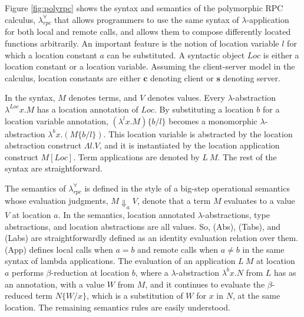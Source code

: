 \documentclass[a4paper]{article}
\theoremstyle{plain}
\theoremstyle{definition}
\newcommand{\polyrpc}{$\lambda_{rpc}^{\forall}$\xspace}
\newcommand{\client}{\textbf{c}}
\newcommand{\server}{\textbf{s}}
\newcommand{\evalRPC}[3]{#1\Downarrow_{#2}#3}
\newcommand{\lamL}[3]{\lambda^{#1}#2.#3}
\newcommand{\subst}[2]{\{#1/#2\}}
\newcommand{\Loc}{Loc}
\begin{document}
Figure \ref{fig:polyrpc} shows the syntax and semantics of the
polymorphic RPC calculus, {\polyrpc} that allows programmers to use
the same syntax of $\lambda$-application for both local and remote
calls, and allows them to compose differently located functions
arbitrarily.
%
An important feature is the notion of location variable $l$ for which
a location constant $a$ can be substituted.
%
A syntactic object $\Loc$ is either a location constant or a location
variable.
%
Assuming the client-server model in the calculus, location constants
are either $\client$ denoting client or $\server$ denoting server.

In the syntax, $M$ denotes terms, and $V$ denotes values.
%
Every $\lambda$-abstraction $\lamL{\Loc}{x}{M}$ has a location
annotation of $\Loc$.
%
By substituting a location $b$ for a location variable annotation,
$(\lamL{l}{x}{M})\subst{b}{l}$ becomes a monomorphic
$\lambda$-abstraction $\lamL{b}{x}{(M\subst{b}{l})}$.
%
This location variable is abstracted by the location abstraction
construct $\Lambda l.V$, and it is instantiated by the location
application construct $M[\Loc]$.
%
Term applications are denoted by $L \ M$.  The rest of the syntax are
straightforward.

The semantics of {\polyrpc} is defined in the style of a big-step
operational semantics whose evaluation judgments, $\evalRPC{M}{a}{V}$,
denote that a term $M$ evaluates to a value $V$ at location $a$.
%
In the semantics, location annotated $\lambda$-abstractions, type
abstractions, and location abstractions are all values.
%
So, (Abs), (Tabs), and (Labs) are straightforwardly defined as an
identity evaluation relation over them.
%
(App) defines local calls when $a=b$ and remote calls when $a\not=b$
in the same syntax of lambda applications.
%
The evaluation of an application $L \ M$ at location $a$ performs
$\beta$-reduction at location $b$, where a $\lambda$-abstraction
$\lamL{b}{x}{N}$ from $L$ has as an annotation, with a value $W$ from
$M$, and it continues to evaluate the $\beta$-reduced term
$N\subst{W}{x}$, which is a substitution of $W$ for $x$ in $N$, at the
same location.
%
The remaining semantics rules are easily understood.
\end{document}
